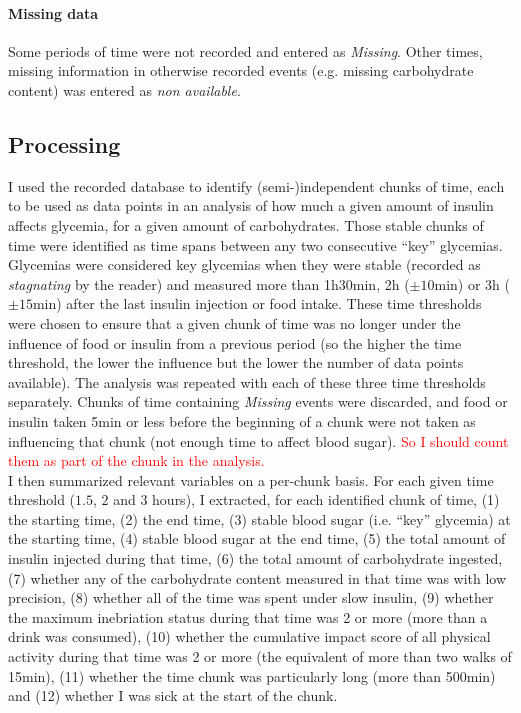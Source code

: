\paragraph{Missing data} Some periods of time were not recorded and entered as \textit{Missing}.
Other times, missing information in otherwise recorded events (e.g. missing carbohydrate content) was entered as \textit{non available}.

\subsection*{Processing}

I used the recorded database to identify (semi-)independent chunks of time, each to be used as data points in an analysis of how much a given amount of insulin affects glycemia, for a given amount of carbohydrates.
Those stable chunks of time were identified as time spans between any two consecutive ``key'' glycemias.
Glycemias were considered key glycemias when they were stable (recorded as \textit{stagnating} by the reader) and measured more than 1h30min, 2h ($\pm10$min) or 3h ($\pm 15$min) after the last insulin injection or food intake.
These time thresholds were chosen to ensure that a given chunk of time was no longer under the influence of food or insulin from a previous period (so the higher the time threshold, the lower the influence but the lower the number of data points available).
The analysis was repeated with each of these three time thresholds separately.
Chunks of time containing \textit{Missing} events were discarded, and food or insulin taken 5min or less before the beginning of a chunk were not taken as influencing that chunk (not enough time to affect blood sugar).
\textcolor{red}{So I should count them as part of the chunk in the analysis.}\\

I then summarized relevant variables on a per-chunk basis.
For each given time threshold ($1.5$, $2$ and $3$ hours), I extracted, for each identified chunk of time, (1) the starting time, (2) the end time, (3) stable blood sugar (i.e. ``key'' glycemia) at the starting time, (4) stable blood sugar at the end time, (5) the total amount of insulin injected during that time, (6) the total amount of carbohydrate ingested, (7) whether any of the carbohydrate content measured in that time was with low precision, (8) whether all of the time was spent under slow insulin, (9) whether the maximum inebriation status during that time was 2 or more (more than a drink was consumed), (10) whether the cumulative impact score of all physical activity during that time was 2 or more (the equivalent of more than two walks of 15min), (11) whether the time chunk was particularly long (more than 500min) and (12) whether I was sick at the start of the chunk.\\

